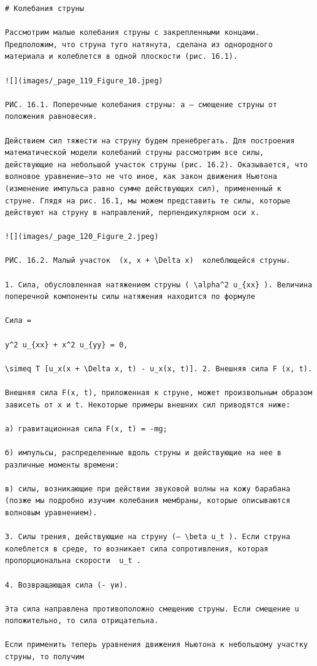 \documentclass[
  ukrainian,
]{article}
\begin{document}
\begin{verbatim}
# Колебания струны

Рассмотрим малые колебания струны с закрепленными концами. Предположим, что струна туго натянута, сделана из однородного материала и колеблется в одной плоскости (рис. 16.1).

![](images/_page_119_Figure_10.jpeg)

РИС. 16.1. Поперечные колебания струны: a — смещение струны от положения равновесия.

Действием сил тяжести на струну будем пренебрегать. Для построения математической модели колебаний струны рассмотрим все силы, действующие на небольшой участок струны (рис. 16.2). Оказывается, что волновое уравнение—это не что иное, как закон движения Ньютона (изменение импульса равно сумме действующих сил), примененный к струне. Глядя на рис. 16.1, мы можем представить те силы, которые действуют на струну в направлений, перпендикулярном оси х.

![](images/_page_120_Figure_2.jpeg)

РИС. 16.2. Малый участок  (x, x + \Delta x)  колеблющейся струны.

1. Сила, обусловленная натяжением струны ( \alpha^2 u_{xx} ). Величина поперечной компоненты силы натяжения находится по формуле

Сила =

y^2 u_{xx} + x^2 u_{yy} = 0,

\simeq T [u_x(x + \Delta x, t) - u_x(x, t)]. 2. Внешняя сила F (x, t).

Внешняя сила F(x, t), приложенная к струне, может произвольным образом зависеть от x и t. Некоторые примеры внешних сил приводятся ниже:

а) гравитационная сила F(x, t) = -mg;

б) импульсы, распределенные вдоль струны и действующие на нее в различные моменты времени:

в) силы, возникающие при действии звуковой волны на кожу барабана (позже мы подробно изучим колебания мембраны, которые описываются волновым уравнением).

3. Силы трения, действующие на струну (— \beta u_t ). Если струна колеблется в среде, то возникает сила сопротивления, которая пропорциональна скорости  u_t .

4. Возвращающая сила (- үи).

Эта сила направлена противоположно смещению струны. Если смещение u положительно, то сила отрицательна.

Если применить теперь уравнения движения Ньютона к небольшому участку струны, то получим


\end{verbatim}
\end{document}
